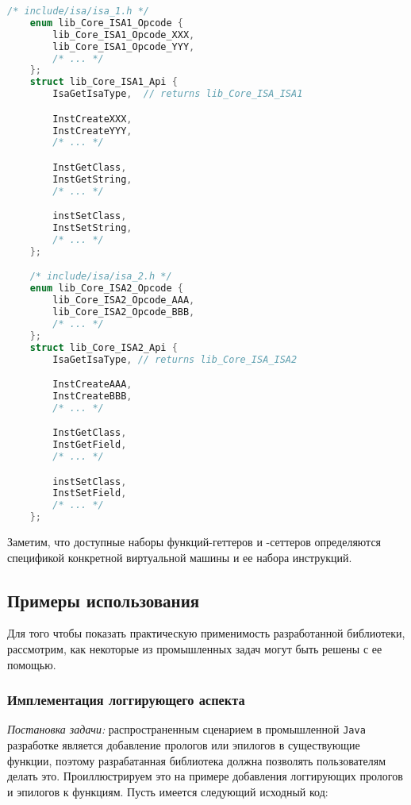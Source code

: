 \begin{lstlisting}[language=C, label=lst:libIsaApi]
    /* include/isa/isa_1.h */
    enum lib_Core_ISA1_Opcode {
        lib_Core_ISA1_Opcode_XXX,
        lib_Core_ISA1_Opcode_YYY,
        /* ... */
    };
    struct lib_Core_ISA1_Api {
        IsaGetIsaType,  // returns lib_Core_ISA_ISA1

        InstCreateXXX,
        InstCreateYYY,
        /* ... */

        InstGetClass,
        InstGetString,
        /* ... */

        instSetClass,
        InstSetString,
        /* ... */
    };

    /* include/isa/isa_2.h */
    enum lib_Core_ISA2_Opcode {
        lib_Core_ISA2_Opcode_AAA,
        lib_Core_ISA2_Opcode_BBB,
        /* ... */
    };
    struct lib_Core_ISA2_Api {
        IsaGetIsaType, // returns lib_Core_ISA_ISA2

        InstCreateAAA,
        InstCreateBBB,
        /* ... */

        InstGetClass,
        InstGetField,
        /* ... */

        instSetClass,
        InstSetField,
        /* ... */
    };
\end{lstlisting}

Заметим, что доступные наборы функций-геттеров и -сеттеров определяются спецификой конкретной виртуальной машины и ее набора инструкций.

\subsection{Примеры использования}

Для того чтобы показать практическую применимость разработанной библиотеки, рассмотрим, как некоторые из промышленных задач могут быть решены с ее помощью.

\subsubsection{Имплементация логгирующего аспекта}

\textit{Постановка задачи:} распространенным сценарием в промышленной \texttt{Java} разработке является добавление прологов или эпилогов в существующие функции, поэтому разрабатанная библиотека должна позволять пользователям делать это. Проиллюстрируем это на примере добавления логгирующих прологов и эпилогов к функциям. Пусть имеется следующий исходный код:

